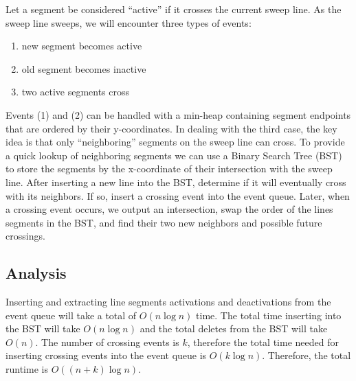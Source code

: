 \documentclass{article}
\begin{document}
Let a segment be considered ``active'' if it crosses the current sweep line.  
As the sweep line sweeps, we will encounter three types of events: 

\begin{enumerate}
    \item new segment becomes active
    \item old segment becomes inactive
    \item two active segments cross
\end{enumerate}

Events (1) and (2) can be handled with a min-heap containing segment endpoints
that are ordered by their y-coordinates.  In dealing with the third case, the
key idea is that only ``neighboring'' segments on the sweep line can cross.  To
provide a quick lookup of neighboring segments we can use a Binary Search Tree
(BST) to store the segments by the x-coordinate of their intersection with the
sweep line.  After inserting a new line into the BST, determine if it will
eventually cross with its neighbors.  If so, insert a crossing event into the
event queue.  Later, when a crossing event occurs, we output an intersection, 
swap the order of the lines segments in the BST, and find their two new 
neighbors and possible future crossings.

\subsection{Analysis}

Inserting and extracting line segments activations and deactivations from the 
event queue will take a total of $O(n \log{n})$ time.  The total time inserting 
into the BST will take $O(n \log{n})$ and the total deletes from the BST will 
take $O(n)$.  The number of crossing events is $k$, therefore the total time
needed for inserting crossing events into the event queue is $O(k \log{n})$. 
Therefore, the total runtime is $O((n+k) \log{n})$.
\end{document}
